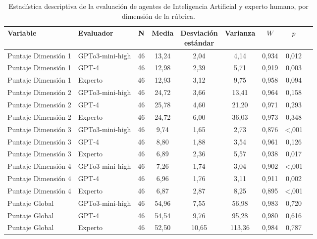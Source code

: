 \documentclass[spanish]{textolivre}
\begin{document}
\begin{table}[h!]
\centering
\begin{threeparttable}
\caption{Estadística descriptiva de la evaluación de agentes de Inteligencia Artificial y experto humano, por dimensión de la rúbrica.}\label{tab-2}
\small
\begin{tabular}{p{3cm} p{2.5cm} c c c c c c c}
\toprule
Variable & Evaluador & N & Media & \shortstack{Desviación \\ estándar} & Varianza & $W$ & $p$ \\
\midrule
Puntaje Dimensión 1 & GPTo3-mini-high & 46 & 13,24 & 2,04 & 4,14 & 0,934 & 0,012 \\
Puntaje Dimensión 1 & GPT-4 & 46 & 12,98 & 2,39 & 5,71 & 0,919 & 0,003 \\
Puntaje Dimensión 1 & Experto & 46 & 12,93 & 3,12 & 9,75 & 0,958 & 0,094 \\

Puntaje Dimensión 2 & GPTo3-mini-high & 46 & 24,72 & 3,66 & 13,41 & 0,964 & 0,158 \\
Puntaje Dimensión 2 & GPT-4 & 46 & 25,78 & 4,60 & 21,20 & 0,971 & 0,293 \\
Puntaje Dimensión 2 & Experto & 46 & 24,72 & 6,00 & 36,03 & 0,973 & 0,348 \\

Puntaje Dimensión 3 & GPTo3-mini-high & 46 & 9,74 & 1,65 & 2,73 & 0,876 & <,001 \\
Puntaje Dimensión 3 & GPT-4 & 46 & 8,80 & 1,88 & 3,54 & 0,961 & 0,126 \\
Puntaje Dimensión 3 & Experto & 46 & 6,89 & 2,36 & 5,57 & 0,938 & 0,017 \\

Puntaje Dimensión 4 & GPTo3-mini-high & 46 & 7,26 & 1,74 & 3,04 & 0,902 & <,001 \\
Puntaje Dimensión 4 & GPT-4 & 46 & 6,96 & 1,76 & 3,11 & 0,911 & 0,002 \\
Puntaje Dimensión 4 & Experto & 46 & 6,87 & 2,87 & 8,25 & 0,895 & <,001 \\

Puntaje Global & GPTo3-mini-high & 46 & 54,96 & 7,55 & 56,98 & 0,983 & 0,720 \\
Puntaje Global & GPT-4 & 46 & 54,54 & 9,76 & 95,28 & 0,980 & 0,616 \\
Puntaje Global & Experto & 46 & 52,50 & 10,65 & 113,36 & 0,984 & 0,787 \\
\bottomrule
\end{tabular}
\end{threeparttable}
\end{table}
\end{document}
